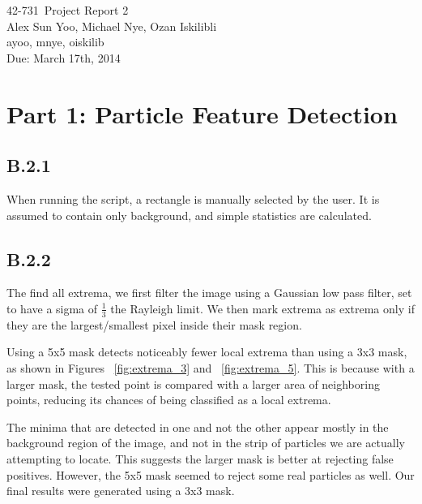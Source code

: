 \documentclass{article}
\newcommand{\hmwkTitle}{Project Report 2}
\newcommand{\hmwkDueDate}{March 17th, 2014}
\newcommand{\hmwkClass}{42-731}
\newcommand{\hmwkAuthor}{Alex Sun Yoo, Michael Nye, Ozan Iskilibli}
\newcommand{\hmwkEmail}{ayoo, mnye, oiskilib}
\newcommand{\hmwkCollaborators}{}
\begin{document}
\thispagestyle{plain}
\begin{center}
{\Large \hmwkClass\ \hmwkTitle} \\
\hmwkAuthor \\
\hmwkEmail \\
\ifthenelse{\equal{\hmwkCollaborators}{}}{}{Collaborators: \hmwkCollaborators\\}
Due: \hmwkDueDate\\
\end{center}

\section*{Part 1: Particle Feature Detection}

\subsection*{B.2.1}

When running the script, a rectangle is manually selected by the user. It is assumed to contain only background, and simple statistics are calculated.

\subsection*{B.2.2}

The find all extrema, we first filter the image using a Gaussian low pass filter, set to have a sigma of $\frac{1}{3}$ the Rayleigh limit. We then mark extrema as extrema only if they are the largest/smallest pixel inside their mask region.

Using a 5x5 mask detects noticeably fewer local extrema than using a 3x3 mask, as shown in Figures ~\ref{fig:extrema_3} and ~\ref{fig:extrema_5}. This is because with a larger mask, the tested point is compared with a larger area of neighboring points, reducing its chances of being classified as a local extrema.

The minima that are detected in one and not the other appear mostly in the background region of the image, and not in the strip of particles we are actually attempting to locate. This suggests the larger mask is better at rejecting false positives. However, the 5x5 mask seemed to reject some real particles as well. Our final results were generated using a 3x3 mask.
\end{document}
